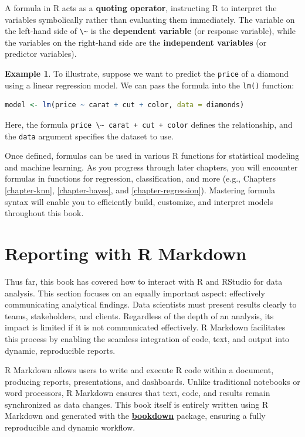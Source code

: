 \documentclass[
]{book}
\newcommand{\passthrough}[1]{#1}
\theoremstyle{definition}
\theoremstyle{definition}
\newtheorem{example}{Example}[chapter]
\theoremstyle{definition}
\theoremstyle{definition}
\theoremstyle{remark}
\begin{document}
A formula in R acts as a \textbf{quoting operator}, instructing R to interpret the variables symbolically rather than evaluating them immediately. The variable on the left-hand side of \passthrough{\lstinline!\~!} is the \textbf{dependent variable} (or response variable), while the variables on the right-hand side are the \textbf{independent variables} (or predictor variables).

\begin{example}
\protect\hypertarget{exm:ex-formula}{}\label{exm:ex-formula}To illustrate, suppose we want to predict the \passthrough{\lstinline!price!} of a diamond using a linear regression model. We can pass the formula into the \passthrough{\lstinline!lm()!} function:

\begin{lstlisting}[language=R]
model <- lm(price ~ carat + cut + color, data = diamonds)
\end{lstlisting}

Here, the formula \passthrough{\lstinline!price \~ carat + cut + color!} defines the relationship, and the \passthrough{\lstinline!data!} argument specifies the dataset to use.
\end{example}

Once defined, formulas can be used in various R functions for statistical modeling and machine learning. As you progress through later chapters, you will encounter formulas in functions for regression, classification, and more (e.g., Chapters \ref{chapter-knn}, \ref{chapter-bayes}, and \ref{chapter-regression}). Mastering formula syntax will enable you to efficiently build, customize, and interpret models throughout this book.

\section{Reporting with R Markdown}\label{reporting-with-r-markdown}

Thus far, this book has covered how to interact with R and RStudio for data analysis. This section focuses on an equally important aspect: effectively communicating analytical findings. Data scientists must present results clearly to teams, stakeholders, and clients. Regardless of the depth of an analysis, its impact is limited if it is not communicated effectively. R Markdown facilitates this process by enabling the seamless integration of code, text, and output into dynamic, reproducible reports.

R Markdown allows users to write and execute R code within a document, producing reports, presentations, and dashboards. Unlike traditional notebooks or word processors, R Markdown ensures that text, code, and results remain synchronized as data changes. This book itself is entirely written using R Markdown and generated with the \href{https://bookdown.org}{\textbf{bookdown}} package, ensuring a fully reproducible and dynamic workflow.
\end{document}
